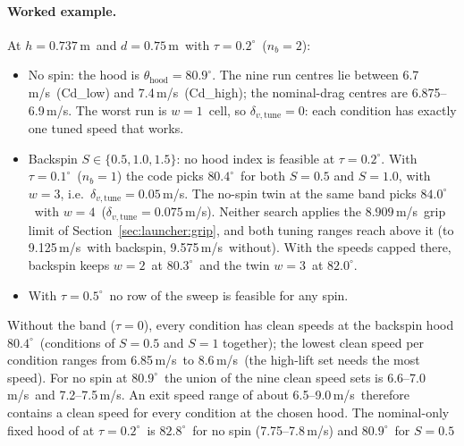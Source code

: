 \paragraph{Worked example.}
At $h=0.737$\,\unit{m}\assumed\ and $d=0.75$\,\unit{m}\assumed\ with $\tau=0.2^\circ$\assumed\
($n_b=2$\derived):
\begin{itemize}
  \item No spin: the hood is $\theta_{\mathrm{hood}}=80.9^\circ$\predicted.
    The nine run centres lie between 6.7\,\unit{m/s}\predicted\ (Cd\_low) and
    7.4\,\unit{m/s}\predicted\ (Cd\_high); the nominal-drag centres are
    6.875--6.9\,\unit{m/s}\predicted.
    The worst run is $w=1$\predicted\ cell, so $\delta_{v,\mathrm{tune}}=0$\derived: each condition has
    exactly one tuned speed that works.
  \item Backspin $S\in\{0.5,1.0,1.5\}$: no hood index is feasible at $\tau=0.2^\circ$\assumed.
    With $\tau=0.1^\circ$\assumed\ ($n_b=1$\derived) the code picks $80.4^\circ$\predicted\ for both
    $S=0.5$ and $S=1.0$, with $w=3$\predicted, i.e.\
    $\delta_{v,\mathrm{tune}}=0.05$\,\unit{m/s}\derived.
    The no-spin twin at the same band picks $84.0^\circ$\predicted\ with $w=4$\predicted\
    ($\delta_{v,\mathrm{tune}}=0.075$\,\unit{m/s}\derived).
    Neither search applies the $8.909$\,\unit{m/s}\predicted\ grip limit of
    Section~\ref{sec:launcher:grip}, and both tuning ranges reach above it (to 9.125\,\unit{m/s}\predicted\
    with backspin, 9.575\,\unit{m/s}\predicted\ without).
    With the speeds capped there, backspin keeps $w=2$\predicted\ at $80.3^\circ$\predicted\ and the
    twin $w=3$\predicted\ at $82.0^\circ$\predicted.
  \item With $\tau=0.5^\circ$\assumed\ no row of the sweep is feasible for any spin.
\end{itemize}
Without the band ($\tau=0$), every condition has clean speeds at the backspin hood $80.4^\circ$\predicted\
(conditions of $S=0.5$ and $S=1$ together);
the lowest clean speed per condition ranges from 6.85\,\unit{m/s}\predicted\ to 8.6\,\unit{m/s}\predicted\
(the high-lift set needs the most speed).
For no spin at $80.9^\circ$\predicted\ the union of the nine clean speed sets is
6.6--7.0\,\unit{m/s}\predicted\ and 7.2--7.5\,\unit{m/s}\predicted.
An exit speed range of about 6.5--9.0\,\unit{m/s}\predicted\ therefore contains a clean speed for
every condition at the chosen hood.
The nominal-only fixed hood of \code{describe} at $\tau=0.2^\circ$\assumed\ is $82.8^\circ$\predicted\
for no spin (7.75--7.8\,\unit{m/s}\predicted) and $80.9^\circ$\predicted\ for $S=0.5$
